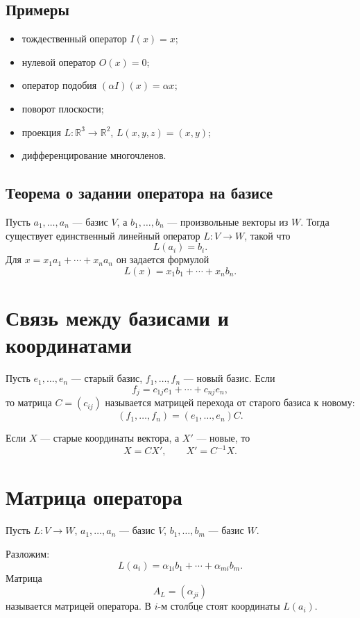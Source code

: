 \documentclass[12pt,a4paper]{article}
\newcommand{\R}{\mathbb{R}}
\begin{document}
\subsection*{Примеры}

\begin{itemize}
    \item тождественный оператор $I(x)=x$;
    \item нулевой оператор $O(x)=0$;
    \item оператор подобия $(\alpha I)(x)=\alpha x$;
    \item поворот плоскости;
    \item проекция $L:\R^3\to\R^2$, $L(x,y,z)=(x,y)$;
    \item дифференцирование многочленов.
\end{itemize}

\subsection*{Теорема о задании оператора на базисе}

Пусть $a_1,\ldots,a_n$ --- базис $V$, а $b_1,\ldots,b_n$ --- произвольные векторы из $W$. Тогда существует единственный линейный оператор $L:V\to W$, такой что
\[
    L(a_i)=b_i.
\]
Для $x=x_1a_1+\cdots+x_na_n$ он задается формулой
\[
    L(x)=x_1b_1+\cdots+x_nb_n.
\]

\section{Связь между базисами и координатами}

Пусть $e_1,\ldots,e_n$ --- старый базис, $f_1,\ldots,f_n$ --- новый базис. Если
\[
    f_j=c_{1j}e_1+\cdots+c_{nj}e_n,
\]
то матрица $C=(c_{ij})$ называется матрицей перехода от старого базиса к новому:
\[
    (f_1,\ldots,f_n)=(e_1,\ldots,e_n)C.
\]

Если $X$ --- старые координаты вектора, а $X'$ --- новые, то
\[
    X=CX',\qquad X'=C^{-1}X.
\]

\section{Матрица оператора}

Пусть $L:V\to W$, $a_1,\ldots,a_n$ --- базис $V$, $b_1,\ldots,b_m$ --- базис $W$.

Разложим:
\[
    L(a_i)=\alpha_{1i}b_1+\cdots+\alpha_{mi}b_m.
\]
Матрица
\[
    A_L=(\alpha_{ji})
\]
называется матрицей оператора. В $i$-м столбце стоят координаты $L(a_i)$.
\end{document}

